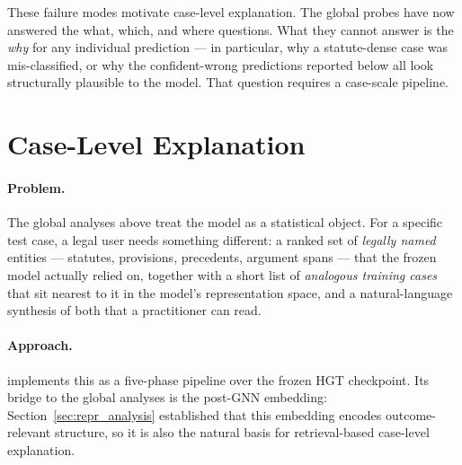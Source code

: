 These failure modes motivate case-level explanation.  The global
probes have now answered the what, which, and where questions.  What
they cannot answer is the \emph{why} for any individual prediction
--- in particular, why a statute-dense case was mis-classified, or
why the confident-wrong predictions reported below all look
structurally plausible to the model.  That question requires a
case-scale pipeline.

\section{Case-Level Explanation}
\label{sec:case_pipeline}

\paragraph{Problem.}
The global analyses above treat the model as a statistical object.
For a specific test case, a legal user needs something different: a
ranked set of \emph{legally named} entities --- statutes, provisions,
precedents, argument spans --- that the frozen model actually relied
on, together with a short list of \emph{analogous training cases}
that sit nearest to it in the model's representation space, and a
natural-language synthesis of both that a practitioner can read.

\paragraph{Approach.}
 implements this as a five-phase pipeline over
the frozen HGT checkpoint.  Its bridge to the global analyses is the
post-GNN embedding: Section~\ref{sec:repr_analysis} established that
this embedding encodes outcome-relevant structure, so it is also the
natural basis for retrieval-based case-level explanation.

